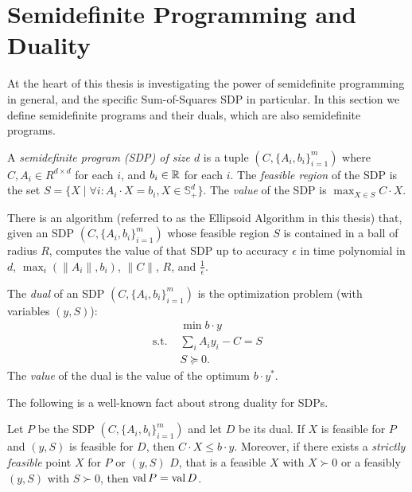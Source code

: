 \section{Semidefinite Programming and Duality}
At the heart of this thesis is investigating the power of semidefinite programming in general, and the specific Sum-of-Squares SDP in particular.
In this section we define semidefinite programs and their duals, which are also semidefinite programs. 

\begin{definition}
A \emph{semidefinite program (SDP) of size $d$} is a tuple $(C,\{A_i, b_i\}_{i=1}^m)$ where $C,A_i \in R^{d \times d}$ for each $i$, and $b_i \in \mathbb R$ for each $i$.
The \emph{feasible region} of the SDP is the set $S = \{X \mid \forall i: A_i \cdot X = b_i, X \in \mathbb{S}_+^d\}$.
The \emph{value} of the SDP is $\max_{X\in S} C \cdot X$. 
\end{definition}
\begin{fact}
There is an algorithm (referred to as the Ellipsoid Algorithm in this thesis) that, given an SDP $(C, \{A_i,b_i\}_{i=1}^m)$ whose feasible region $S$ is contained in a ball of radius $R$, computes the value of that SDP up to accuracy $\epsilon$ in time polynomial in $d$, $\max_i\left(\|A_i\|,b_i\right)$, $\|C\|$, $R$, and $\frac{1}{\epsilon}$.
\end{fact}

\begin{definition}
The \emph{dual} of an SDP $(C, \{A_i, b_i\}_{i=1}^m)$ is the optimization problem (with variables $(y,S)$): 
\begin{align*}
&\min b \cdot y \\
\text{s.t. }&\sum_i A_i y_i - C = S \\
&S \succeq 0.
\end{align*}
The \emph{value} of the dual is the value of the optimum $b \cdot y^*$. 
\end{definition}
The following is a well-known fact about strong duality for SDPs. 
\begin{lemma}\label{lem:duality}
Let $P$ be the SDP $(C, \{A_i, b_i\}_{i=1}^m)$ and let $D$ be its dual. If $X$ is feasible for $P$ and $(y,S)$ is feasible for $D$, then $C \cdot X \leq b \cdot y$. Moreover, if there exists a \emph{strictly feasible} point $X$ for $P$ or $(y,S)$ $D$, that is a feasible $X$ with $X \succ 0$ or a feasibly $(y,S)$ with $S \succ 0$, then $\operatorname{val}{P} = \operatorname{val}{D}$.
\end{lemma}

